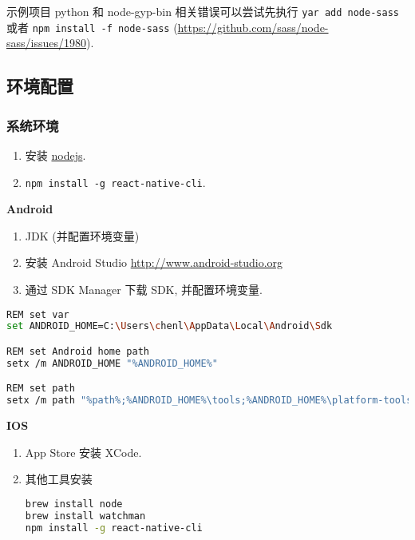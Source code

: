 示例项目 python 和 node-gyp-bin 相关错误可以尝试先执行
\lstinline!yar add node-sass! 或者 \lstinline!npm install -f node-sass!
(\url{https://github.com/sass/node-sass/issues/1980}).

\subsection{环境配置}\label{ux73afux5883ux914dux7f6e}

\subsubsection{系统环境}\label{ux7cfbux7edfux73afux5883}

\begin{enumerate}
\def\labelenumi{\arabic{enumi}.}
\tightlist
\item
  安装 \href{https://nodejs.org}{nodejs}.
\item
  \lstinline!npm install -g react-native-cli!.
\end{enumerate}

\textbf{Android}

\begin{enumerate}
\def\labelenumi{\arabic{enumi}.}
\tightlist
\item
  JDK (并配置环境变量)
\item
  安装 Android Studio \url{http://www.android-studio.org}
\item
  通过 SDK Manager 下载 SDK, 并配置环境变量.
\end{enumerate}

\begin{lstlisting}[language=bash]
REM set var
set ANDROID_HOME=C:\Users\chenl\AppData\Local\Android\Sdk

REM set Android home path
setx /m ANDROID_HOME "%ANDROID_HOME%"

REM set path
setx /m path "%path%;%ANDROID_HOME%\tools;%ANDROID_HOME%\platform-tools;"
\end{lstlisting}

\textbf{IOS}

\begin{enumerate}
\def\labelenumi{\arabic{enumi}.}
\item
  App Store 安装 XCode.
\item
  其他工具安装

\begin{lstlisting}[language=bash]
brew install node
brew install watchman
npm install -g react-native-cli
\end{lstlisting}
\end{enumerate}

